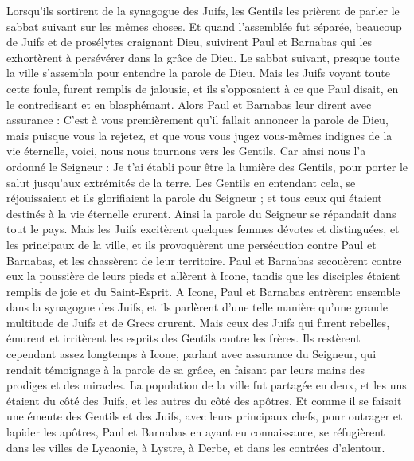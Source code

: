 \begin{multicols}{2}
Lorsqu'ils sortirent de la synagogue des Juifs, les Gentils les prièrent de parler le sabbat suivant sur les mêmes choses.
Et quand l'assemblée fut séparée, beaucoup de Juifs et de prosélytes craignant Dieu, suivirent Paul et Barnabas qui les exhortèrent à persévérer dans la grâce de Dieu.
Le sabbat suivant, presque toute la ville s'assembla pour entendre la parole de Dieu.
Mais les Juifs voyant toute cette foule, furent remplis de jalousie, et ils s'opposaient à ce que Paul disait, en le contredisant et en blasphémant.
Alors Paul et Barnabas leur dirent avec assurance : C'est à vous premièrement qu'il fallait annoncer la parole de Dieu, mais puisque vous la rejetez, et que vous vous jugez vous-mêmes indignes de la vie éternelle, voici, nous nous tournons vers les Gentils.
Car ainsi nous l'a ordonné le Seigneur : Je t'ai établi pour être la lumière des Gentils, pour porter le salut jusqu'aux extrémités de la terre.
Les Gentils en entendant cela, se réjouissaient et ils glorifiaient la parole du Seigneur ; et tous ceux qui étaient destinés à la vie éternelle crurent.
Ainsi la parole du Seigneur se répandait dans tout le pays.
Mais les Juifs excitèrent quelques femmes dévotes et distinguées, et les principaux de la ville, et ils provoquèrent une persécution contre Paul et Barnabas, et les chassèrent de leur territoire.
Paul et Barnabas secouèrent contre eux la poussière de leurs pieds et allèrent à Icone,
tandis que les disciples étaient remplis de joie et du Saint-Esprit.
\VerseOne{}A Icone, Paul et Barnabas entrèrent ensemble dans la synagogue des Juifs, et ils parlèrent d'une telle manière qu'une grande multitude de Juifs et de Grecs crurent.
Mais ceux des Juifs qui furent rebelles, émurent et irritèrent les esprits des Gentils contre les frères.
Ils restèrent cependant assez longtemps à Icone, parlant avec assurance du Seigneur, qui rendait témoignage à la parole de sa grâce, en faisant par leurs mains des prodiges et des miracles.
La population de la ville fut partagée en deux, et les uns étaient du côté des Juifs, et les autres du côté des apôtres.
Et comme il se faisait une émeute des Gentils et des Juifs, avec leurs principaux chefs, pour outrager et lapider les apôtres,
Paul et Barnabas en ayant eu connaissance, se réfugièrent dans les villes de Lycaonie, à Lystre, à Derbe, et dans les contrées d'alentour.

\end{multicols}
